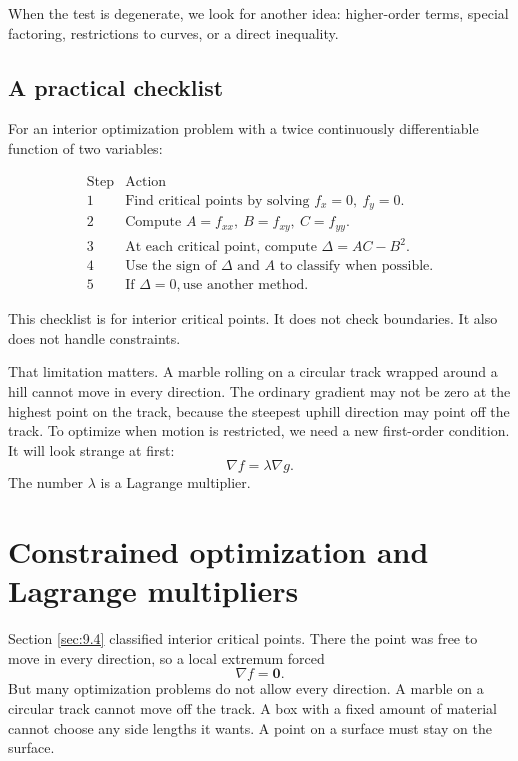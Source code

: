 When the test is degenerate, we look for another idea: higher-order terms, special
factoring, restrictions to curves, or a direct inequality.

\subsection{A practical checklist}

For an interior optimization problem with a twice continuously differentiable function
of two variables:

\[
\begin{array}{c|l}
\text{Step} & \text{Action}\\ \hline
1 & \text{Find critical points by solving } f_x=0,\ f_y=0.\\[1mm]
2 & \text{Compute } A=f_{xx},\ B=f_{xy},\ C=f_{yy}.\\[1mm]
3 & \text{At each critical point, compute } \Delta=AC-B^2.\\[1mm]
4 & \text{Use the sign of } \Delta \text{ and } A \text{ to classify when possible.}\\[1mm]
5 & \text{If } \Delta=0, \text{use another method.}
\end{array}
\]

This checklist is for interior critical points.  It does not check boundaries.  It also does
not handle constraints.

That limitation matters.  A marble rolling on a circular track wrapped around a hill
cannot move in every direction.  The ordinary gradient may not be zero at the highest
point on the track, because the steepest uphill direction may point off the track.  To
optimize when motion is restricted, we need a new first-order condition.  It will look
strange at first:
\[
    \nabla f=\lambda \nabla g.
\]
The number \(\lambda\) is a Lagrange multiplier.
\section{Constrained optimization and Lagrange multipliers}
\label{sec:9.5}

Section \ref{sec:9.4} classified interior critical points.  There the point was free to
move in every direction, so a local extremum forced
\[
    \nabla f=\mathbf 0.
\]
But many optimization problems do not allow every direction.  A marble on a circular
track cannot move off the track.  A box with a fixed amount of material cannot choose
any side lengths it wants.  A point on a surface must stay on the surface.

